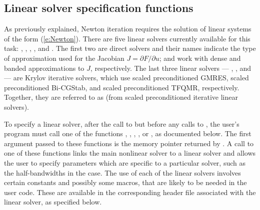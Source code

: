 
\subsection{Linear solver specification functions}\label{sss:lin_solv_init}

As previously explained, Newton iteration requires the solution of
linear systems of the form (\ref{e:Newton}). There are five {\kinsol} linear
solvers currently available for this task: {\kindense}, {\kinband}, {\kinspgmr},
{\kinspbcg}, and {\kinsptfqmr}. The first two are direct solvers and their
names indicate the type of approximation used for the Jacobian
$J = \partial{F}/\partial{u}$; {\kindense} and {\kinband} work with dense and
banded approximations to $J$, respectively. The last three {\kinsol} linear solvers ---
{\kinspgmr}, {\kinspbcg}, and {\kinsptfqmr} --- are Krylov iterative solvers, which
use scaled preconditioned GMRES, scaled preconditioned Bi-CGStab, and scaled
preconditioned TFQMR, respectively. Together, they are referred to as {\kinspils}
(from scaled preconditioned iterative linear solvers).

To specify a {\kinsol} linear solver, after the call to 
but before any calls to , the user's program must call one
of the functions , , ,
, or , as documented below.
The first argument passed to these functions is the {\kinsol}
memory pointer returned by . A call to one of these
functions links the main {\kinsol} nonlinear solver to a linear solver and
allows the user to specify parameters which are specific to a
particular solver, such as the half-bandwidths in the {\kinband} case.
The use of each of the linear solvers involves certain constants and possibly 
some macros, that are likely to be needed in the user code.  These are
available in the corresponding header file associated with the linear
solver, as specified below.

